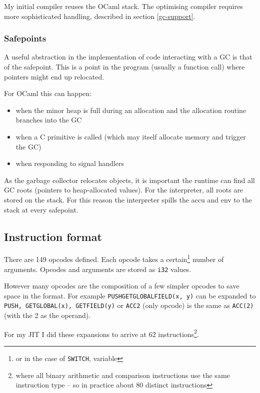 My initial compiler reuses the OCaml stack. The optimising compiler requires more sophisticated
handling, described in section \ref{gc-support}.

\subsubsection{Safepoints}

A useful abstraction in the implementation of code interacting with a GC is that of the safepoint.
This is a point in the program (usually a function call) where pointers might end up relocated.

For OCaml this can happen:

\begin{itemize}
    \item when the minor heap is full during an allocation and the allocation routine branches
          into
          the
          GC
    \item when a C primitive is called	(which may itself allocate memory and trigger the
          GC)
    \item when responding to signal handlers
\end{itemize}

As the garbage collector relocates objects, it is important the runtime can find all GC roots
(pointers to heap-allocated values). For the interpreter, all roots are stored on the stack. For
this reason the interpreter spills the accu and env to the stack at every safepoint.

\subsection{Instruction format}

There are 149 opcodes defined. Each opcode takes a certain\footnote{or in the case of
    \texttt{SWITCH}, variable} number of arguments. Opcodes and arguments are stored as
\texttt{i32}
values.

However many opcodes are the composition of a few simpler opcodes to save space in the
format. For example \texttt{PUSHGETGLOBALFIELD(x, y)} can be expanded to \texttt{PUSH,
    GETGLOBAL(x), GETFIELD(y)} or \texttt{ACC2} (only opcode) is the same as \texttt{ACC(2)}
(with
the 2 as the operand).

For my JIT I did these expansions to arrive at 62 instructions\footnote{where all binary
    arithmetic and comparison instructions use the same instruction type -- so in practice about
    80 distinct instructions}.

